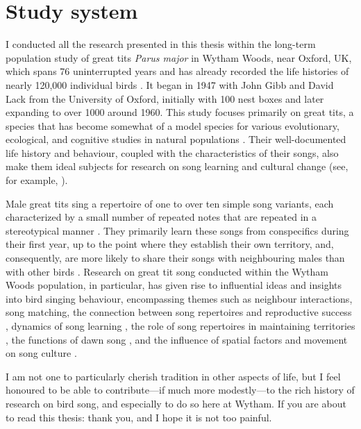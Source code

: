 \section{Study system}
I conducted all the research presented in this thesis within the long-term population study of great tits \textit{Parus major} in Wytham Woods, near Oxford, UK, which spans 76 uninterrupted years and has already recorded the life histories of nearly 120,000 individual birds \autocite{sheldon2022}. It began in 1947 with John Gibb and David Lack from the University of Oxford, initially with 100 nest boxes and later expanding to over 1000 around 1960. This study focuses primarily on great tits, a species that has become somewhat of a model species for various evolutionary, ecological, and cognitive studies in natural populations \autocite{aplin2017, Boyce1987, charmantier2008, cole2012,firth2018,Firth2016a,spurgin2019}. Their well-documented life history and behaviour, coupled with the characteristics of their songs, also make them ideal subjects for research on song learning and cultural change (see, for example, \cite{lambrechts1990, lind1996, rivera-gutierrez2010a, rivera-gutierrez2010, rivera-gutierrez2011, slagsvold1994, Ritschard2012}). 

Male great tits sing a repertoire of one to over ten simple song variants, each characterized by a small number of repeated notes that are repeated in a stereotypical manner \autocite{krebs1978,rivera-gutierrez2010a}. They primarily learn these songs from conspecifics during their first year, up to the point where they establish their own territory, and, consequently, are more likely to share their songs with neighbouring males than with other birds \autocite{mcgregor1982,mcgregor1989}. Research on great tit song conducted within the Wytham Woods population, in particular, has given rise to influential ideas and insights into bird singing behaviour, encompassing themes such as neighbour interactions, song matching, the connection between song repertoires and reproductive success \parencite{mcgregor1981, mcgregor1983, mcgregor1989}, dynamics of song learning \parencite{mcgregor1989, mcgregor1982b}, the role of song repertoires in maintaining territories \parencite{krebs1976, krebs1978}, the functions of dawn song \parencite{kacelnik1983, mace1987}, and the influence of spatial factors and movement on song culture \parencite{fayet2014}. 

I am not one to particularly cherish tradition in other aspects of life, but I feel honoured to be able to contribute---if much more modestly---to the rich history of research on bird song, and especially to do so here at Wytham. If you are about to read this thesis: thank you, and I hope it is not too painful.

